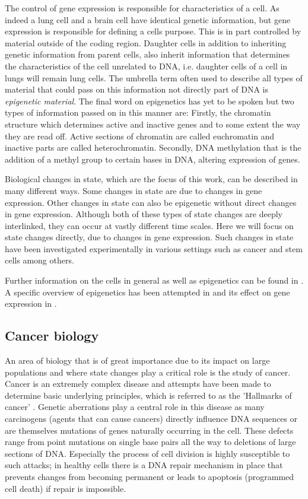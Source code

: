 The control of gene expression is responsible for characteristics of a cell. As indeed a lung cell and a brain cell have  identical genetic information, but gene expression is responsible for defining a cells purpose. This is in part controlled by material outside of the coding region. Daughter cells in addition to inheriting genetic information from parent cells, also inherit information that determines the characteristics of the cell unrelated to DNA, i.e. daughter cells of a cell in lungs will remain lung cells. The umbrella term often used to describe all types of material that could pass on this information not directly part of DNA is \emph{epigenetic material}. The final word on epigenetics has yet to be spoken but two types of information passed on in this manner are: Firstly, the chromatin structure which determines active and inactive genes and to some extent the way they are read off. Active sections of chromatin are called euchromatin and inactive parts are called heterochromatin. Secondly, DNA methylation that is the addition of a methyl group to certain bases in DNA, altering expression of genes.

Biological changes in state, which are the focus of this work, can be described in many different ways. Some changes in state are due to changes in gene expression. Other changes in state can also be epigenetic without direct changes in gene expression. Although both of these types of state changes are deeply interlinked, they can occur at vastly different time scales. Here we will focus on state changes directly, due to changes in gene expression. Such changes in state have been investigated experimentally in various settings such as cancer \citep{Lee:2010kz,Gupta:2011fk} and stem cells \citep{Ohgushi:2011em,Plath:2011is} among others.

Further information on the cells in general as well as epigenetics can be found in \citet[Chapters~1,7]{Alberts:2007tv}. A specific overview of epigenetics has been attempted in \cite{Goldberg:2007tl} and its effect on gene expression in \cite{Gibney:2010ws}.

\subsection{Cancer biology}
\label{sec:cancer-biology}

An area of biology that is of great importance due to its impact on large populations and where state changes play a critical role is the study of cancer. Cancer is an extremely complex disease and attempts have been made to determine basic underlying principles, which is referred to as the 'Hallmarks of cancer' \citep{Hannah:2000wo, Hanahan:2011gu}. Genetic aberrations play a central role in this disease as many carcinogens (agents that can cause cancers) directly influence DNA sequences or are themselves mutations of genes naturally occurring in the cell. These defects range from point mutations on single base pairs all the way to deletions of large sections of DNA. Especially the process of cell division is highly susceptible to such attacks; in healthy cells there is a DNA repair mechanism in place that prevents  changes from becoming permanent or leads to apoptosis (programmed cell death) if repair is impossible.

